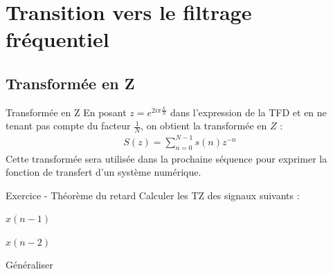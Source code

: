 \documentclass{beamer}
\newcounter{exampleBlockCounter}
\begin{document}

\section{Transition vers le filtrage fréquentiel}
\subsection{Transformée en Z}
\begin{frame}
\begin{block}{Transformée en Z}
En posant $z=e^{2i\pi \frac{k}{N}}$ dans l'expression de la TFD et en ne tenant pas compte du facteur $\frac{1}{N}$, on obtient la transformée en $Z$ :
\begin{align*}
S(z) = \sum_{n=0}^{N-1}s(n)z^{-n}
\end{align*}
Cette transformée sera utilisée dans la prochaine séquence pour exprimer la fonction de transfert d'un système numérique.
\end{block}
\begin{exampleblock}{Exercice  - Théorème du retard}
	\justifying
	Calculer les TZ des signaux suivants :
	\itemize
	\item $x(n-1)$
	\item $x(n-2)$
	\item Généraliser
\end{exampleblock}
\end{frame}
\end{document}
